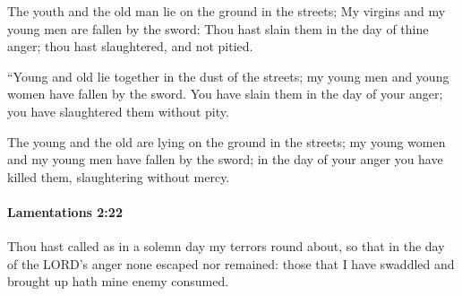 			\begin{versebox}
					\item[BHS] 
					\item[LXX] 
					\item[ASV] The youth and the old man lie on the ground in the streets; My virgins and my young men are fallen by the sword: Thou hast slain them in the day of thine anger; thou hast slaughtered, and not pitied.
					\item[NIV] “Young and old lie together in the dust of the streets; my young men and young women have fallen by the sword. You have slain them in the day of your anger; you have slaughtered them without pity.
					\item[NRSV] The young and the old are lying on the ground in the streets; my young women and my young men have fallen by the sword; in the day of your anger you have killed them, slaughtering without mercy.
			\end{versebox}

		\paragraph{Lamentations 2:22} %
			\label{LAMENTATIONS-2-22}

			Thou hast called as in a solemn day my terrors round about, so that in the day of the LORD’s anger none escaped nor remained: those that I have swaddled and brought up hath mine enemy consumed.

